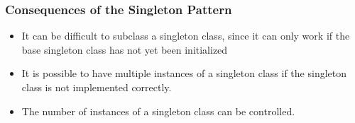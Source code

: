 \documentclass[12pt letter]{report}
\begin{document}
\subsubsection{Consequences of the Singleton Pattern}
\begin{itemize}
  \item It can be difficult to subclass a singleton class, since it can only work if the base singleton class has not yet been initialized
  \item It is possible to have multiple instances of a singleton class if the singleton class is not implemented correctly.
  \item The number of instances of a singleton class can be controlled.
\end{itemize}
\end{document}
